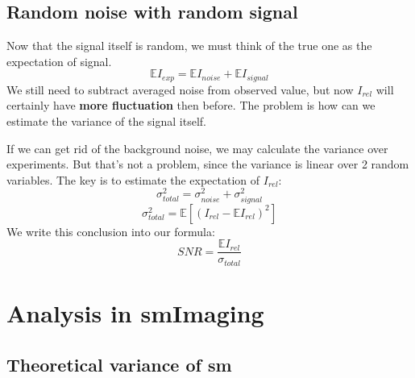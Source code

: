 \documentclass[12pt]{ctexart}%
\begin{document}
\subsection*{Random noise with random signal}
Now that the signal itself is random, we must think of the true one as the expectation of signal. 
\begin{equation}
    \mathbb{E}I_{exp}=\mathbb{E}I_{noise}+\mathbb{E}I_{signal}
\end{equation}
We still need to subtract averaged noise from observed value, but now $I_{rel}$ will certainly have \textbf{more fluctuation} then before. The problem is how can we estimate the variance of the signal itself.
\par If we can get rid of the background noise, we may calculate the variance over experiments. But that's not a problem, since the variance is linear over 2 random variables. The key is to estimate the expectation of $I_{rel}$:
\begin{equation}
    \sigma^2_{total}=\sigma^2_{noise}+\sigma^2_{signal}
\end{equation}
\begin{equation}
    \sigma^2_{total}=\mathbb{E}[({I_{rel}-\mathbb{E}I_{rel}})^2]
\end{equation}
We write this conclusion into our formula:
\begin{equation}
    SNR=\frac{\mathbb{E}I_{rel}}{\sigma_{total}}
\end{equation}
\section{Analysis in smImaging}
\subsection*{Theoretical variance of sm}
\end{document}
